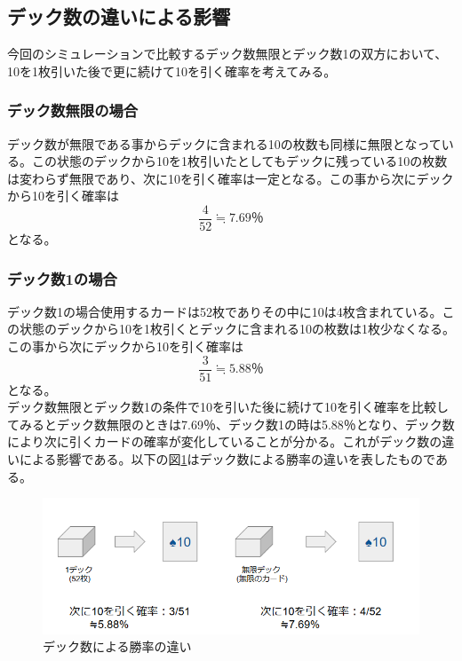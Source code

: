 
\subsection{デック数の違いによる影響}
今回のシミュレーションで比較するデック数無限とデック数1の双方において、10を1枚引いた後で更に続けて10を引く確率を考えてみる。
\subsubsection{デック数無限の場合}
デック数が無限である事からデックに含まれる10の枚数も同様に無限となっている。この状態のデックから10を1枚引いたとしてもデックに残っている10の枚数は変わらず無限であり、次に10を引く確率は一定となる。この事から次にデックから10を引く確率は\begin{equation}\frac{4}{52} \fallingdotseq 7.69％\end{equation}となる。\\
\subsubsection{デック数1の場合}
デック数1の場合使用するカードは52枚でありその中に10は4枚含まれている。この状態のデックから10を1枚引くとデックに含まれる10の枚数は1枚少なくなる。この事から次にデックから10を引く確率は\begin{equation}\frac{3}{51}\fallingdotseq5.88％\end{equation}となる。\\
デック数無限とデック数1の条件で10を引いた後に続けて10を引く確率を比較してみるとデック数無限のときは7.69％、デック数1の時は5.88％となり、デック数により次に引くカードの確率が変化していることが分かる。これがデック数の違いによる影響である。以下の図\ref{hogehoge}はデック数による勝率の違いを表したものである。

\begin{figure}[H]
\begin{center}

 \includegraphics[width=0.7\linewidth]{./figure/DeckDiff.PNG}
 \caption{デック数による勝率の違い \label{hogehoge}}
\end{center}
\end{figure}

